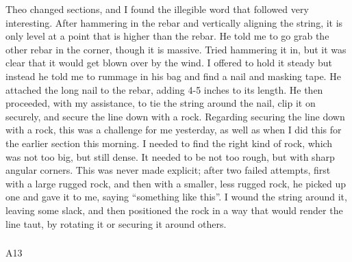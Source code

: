 \documentclass[
]{article}
\makeatletter
\let\oldsubparagraph\subparagraph
\renewcommand{\subparagraph}{
    \@ifstar
      \xxxSubParagraphStar
      \xxxSubParagraphNoStar
  }
\newcommand{\xxxSubParagraphStar}[1]{\oldsubparagraph*{#1}\mbox{}}
\newcommand{\xxxSubParagraphNoStar}[1]{\oldsubparagraph{#1}\mbox{}}
\makeatother
\begin{document}
Theo changed sections, and I found the illegible word that followed very
interesting. After hammering in the rebar and vertically aligning the
string, it is only level at a point that is higher than the rebar. He
told me to go grab the other rebar in the corner, though it is massive.
Tried hammering it in, but it was clear that it would get blown over by
the wind. I offered to hold it steady but instead he told me to rummage
in his bag and find a nail and masking tape. He attached the long nail
to the rebar, adding 4-5 inches to its length. He then proceeded, with
my assistance, to tie the string around the nail, clip it on securely,
and secure the line down with a rock. Regarding securing the line down
with a rock, this was a challenge for me yesterday, as well as when I
did this for the earlier section this morning. I needed to find the
right kind of rock, which was not too big, but still dense. It needed to
be not too rough, but with sharp angular corners. This was never made
explicit; after two failed attempts, first with a large rugged rock, and
then with a smaller, less rugged rock, he picked up one and gave it to
me, saying ``something like this''. I wound the string around it,
leaving some slack, and then positioned the rock in a way that would
render the line taut, by rotating it or securing it around others.

\subparagraph{A13}\label{sec-A13}
\end{document}
